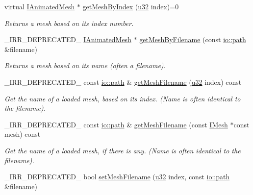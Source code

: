 \begin{DoxyCompactItemize}
virtual \hyperlink{classirr_1_1scene_1_1IAnimatedMesh}{I\+Animated\+Mesh} $\ast$ \hyperlink{classirr_1_1scene_1_1IMeshCache_a06e7755013445f9bc3d7339fbd009e31}{get\+Mesh\+By\+Index} (\hyperlink{namespaceirr_a0416a53257075833e7002efd0a18e804}{u32} index)=0
\begin{DoxyCompactList}\small\item\em Returns a mesh based on its index number. \end{DoxyCompactList}\item 
\+\_\+\+I\+R\+R\+\_\+\+D\+E\+P\+R\+E\+C\+A\+T\+E\+D\+\_\+ \hyperlink{classirr_1_1scene_1_1IAnimatedMesh}{I\+Animated\+Mesh} $\ast$ \hyperlink{classirr_1_1scene_1_1IMeshCache_aa3946324e39cc074b1f73e01d57cae70}{get\+Mesh\+By\+Filename} (const \hyperlink{namespaceirr_1_1io_ab1bdc45edb3f94d8319c02bc0f840ee1}{io\+::path} \&filename)
\begin{DoxyCompactList}\small\item\em Returns a mesh based on its name (often a filename). \end{DoxyCompactList}\item 
\+\_\+\+I\+R\+R\+\_\+\+D\+E\+P\+R\+E\+C\+A\+T\+E\+D\+\_\+ const \hyperlink{namespaceirr_1_1io_ab1bdc45edb3f94d8319c02bc0f840ee1}{io\+::path} \& \hyperlink{classirr_1_1scene_1_1IMeshCache_afda96c4fb8ab272f3d3688dcaef3abc3}{get\+Mesh\+Filename} (\hyperlink{namespaceirr_a0416a53257075833e7002efd0a18e804}{u32} index) const
\begin{DoxyCompactList}\small\item\em Get the name of a loaded mesh, based on its index. (Name is often identical to the filename). \end{DoxyCompactList}\item 
\+\_\+\+I\+R\+R\+\_\+\+D\+E\+P\+R\+E\+C\+A\+T\+E\+D\+\_\+ const \hyperlink{namespaceirr_1_1io_ab1bdc45edb3f94d8319c02bc0f840ee1}{io\+::path} \& \hyperlink{classirr_1_1scene_1_1IMeshCache_adc17a943cd79a94710def8dd7d2de605}{get\+Mesh\+Filename} (const \hyperlink{classirr_1_1scene_1_1IMesh}{I\+Mesh} $\ast$const mesh) const
\begin{DoxyCompactList}\small\item\em Get the name of a loaded mesh, if there is any. (Name is often identical to the filename). \end{DoxyCompactList}\item 
\+\_\+\+I\+R\+R\+\_\+\+D\+E\+P\+R\+E\+C\+A\+T\+E\+D\+\_\+ bool \hyperlink{classirr_1_1scene_1_1IMeshCache_a5b87031dbfdb70a59c00a1b892b74c3d}{set\+Mesh\+Filename} (\hyperlink{namespaceirr_a0416a53257075833e7002efd0a18e804}{u32} index, const \hyperlink{namespaceirr_1_1io_ab1bdc45edb3f94d8319c02bc0f840ee1}{io\+::path} \&filename)

\end{DoxyCompactItemize}
